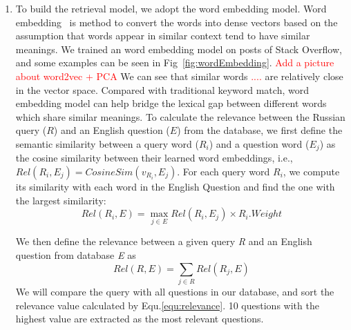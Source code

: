 \begin{enumerate}
 \item To build the retrieval model, we adopt the word embedding model. Word embedding~\cite{??} is method to convert the words into dense vectors based on the assumption that words appear in similar context tend to have similar meanings. We trained an word embedding model on posts of Stack Overflow, and some examples can be seen in Fig~\ref{fig:wordEmbedding}. \textcolor{red}{Add a picture about word2vec + PCA} We can see that similar words \textcolor{red}{....} are relatively close in the vector space. Compared with traditional keyword match, word embedding model can help bridge the lexical gap between different words which share similar meanings. To calculate the relevance between the Russian query ($R$) and an English question ($E$) from the database, we first define the semantic similarity between a query word ($R_i$) and a question word ($E_j$) as the cosine similarity between their learned word embeddings, i.e., $Rel(R_i, E_j)=CosineSim(v_{R_i}, E_j)$. For each query word $R_i$, we compute its similarity with each word in the English Question and find the one with the largest similarity: 
 	 \begin{equation}
       Rel(R_i,E)=\max\limits_{j \in E}Rel(R_i, E_j)\times R_i.Weight
     \end{equation}

     We then define the relevance between a given query \emph{R} and an English question from database \emph{E} as 
      \begin{equation}
      	 \label{equ:relevance}
         Rel(R, E) = \sum_{j\in R}Rel(R_j, E)
      \end{equation}
     We will compare the query with all questions in our database, and sort the relevance value calculated by Equ.\ref{equ:relevance}.
     10 questions with the highest value are extracted as the most relevant questions.
 \end{enumerate}
 
